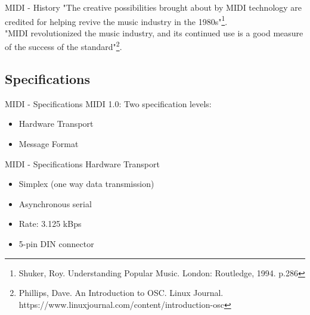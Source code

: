 \documentclass{beamer}
\begin{document}
\begin{frame}{MIDI - History}
    "The creative possibilities brought about by MIDI technology are credited for helping revive the music industry in the 1980s"\footnote{Shuker, Roy. Understanding Popular Music. London: Routledge, 1994. p.286}.\\
    \vspace{5mm}
    "MIDI revolutionized the music industry, and its continued use is a good measure of the success of the standard"\footnote{Phillips, Dave. An Introduction to OSC. Linux Journal. https://www.linuxjournal.com/content/introduction-osc}.
\end{frame}

\subsection{Specifications}

\begin{frame}{MIDI - Specifications}
    MIDI 1.0: Two specification levels:
    \begin{itemize}
        \item Hardware Transport
        \item Message Format
    \end{itemize}
\end{frame}

\begin{frame}{MIDI - Specifications}
    Hardware Transport\\
    \vspace{5mm}
    \begin{itemize}
        \item Simplex (one way data transmission)
        \item Asynchronous serial
        \item Rate: 3.125 kBps
        \item 5-pin DIN connector
    \end{itemize}
\end{frame}
\end{document}
